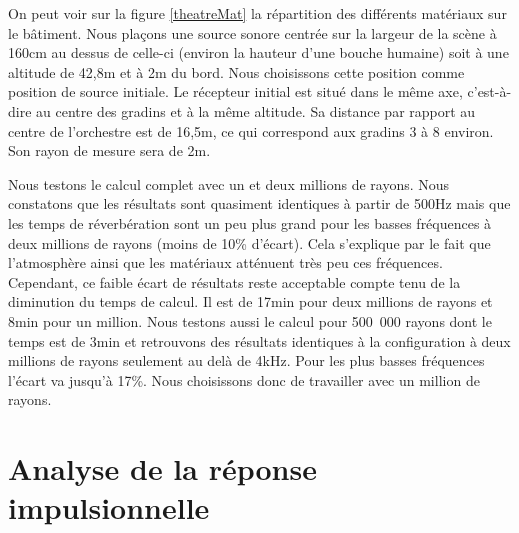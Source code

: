 On peut voir sur la figure \ref{theatreMat} la répartition des différents matériaux sur le bâtiment. Nous plaçons une source sonore centrée sur la largeur de la scène à 160cm au dessus de celle-ci (environ la hauteur d'une bouche humaine) soit à une altitude de 42,8m et à 2m du bord. Nous choisissons cette position comme position de source initiale. Le récepteur initial est situé dans le même axe, c'est-à-dire au centre des gradins et à la même altitude. Sa distance par rapport au centre de l'orchestre est de 16,5m, ce qui correspond aux gradins 3 à 8 environ. Son rayon de mesure sera de 2m. 

Nous testons le calcul complet avec un et deux millions de rayons. Nous constatons que les résultats sont quasiment identiques à partir de 500Hz mais que les temps de réverbération sont un peu plus grand pour les basses fréquences à deux millions de rayons (moins de 10\% d'écart). Cela s'explique par le fait que l'atmosphère ainsi que les matériaux atténuent très peu ces fréquences. Cependant, ce faible écart de résultats reste acceptable compte tenu de la diminution du temps de calcul. Il est de 17min pour deux millions de rayons et 8min pour un million. Nous testons aussi le calcul pour 500~000 rayons dont le temps est de 3min et retrouvons des résultats identiques à la configuration à deux millions de rayons seulement au delà de 4kHz. Pour les plus basses fréquences l'écart va jusqu'à 17\%. Nous choisissons donc de travailler avec un million de rayons.



\section{Analyse de la réponse impulsionnelle} \label{sect_analyse_rir}



